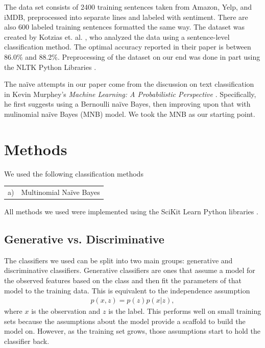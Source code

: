 \documentclass{article} %
\begin{document}
	The data set consists of 2400 training sentences taken from Amazon, Yelp, and iMDB, preprocessed into separate lines and labeled with sentiment. There are also 600 labeled training sentences formatted the same way. The dataset was created by Kotzias et. al. \cite{Kotzias2015}, who analyzed the data using a sentence-level classification method. The optimal accuracy reported in their paper is between 86.0\% and 88.2\%. Preprocessing of the dataset on our end was done in part using the NLTK Python Libraries \cite{nltk}.
	
	The na\"ive attempts in our paper come from the discussion on text classification in Kevin Murphey's \emph{Machine Learning: A Probabilistic Perspective} \cite{Murphy2012}. Specifically, he first suggests using a Bernoulli na\"ive Bayes, then improving upon that with mulinomial na\"ive Bayes (MNB) model. We took the MNB as our starting point. 
	
	
	\section{Methods}
	
	We used the following classification methods
	
	\begin{tabular}{rl}
		a) & Multinomial Na\"ive Bayes\\
	\end{tabular}
	
	All methods we used were implemented using the SciKit Learn Python libraries \cite{scikit-learn}. 
	
	\subsection{Generative vs. Discriminative}
	
	The classifiers we used can be split into two main groups: generative and discriminative classifiers. Generative classifiers are ones that assume a model for the observed features based on the class and then fit the parameters of that model to the training data. This is equivalent to the independence assumption
	\begin{align}
	p(x,z) = p(z)p(x|z),
	\end{align}
	where $x$ is the observation and $z$ is the label. This performs well on small training sets because the assumptions about the model provide a scaffold to build the model on. However, as the training set grows, those assumptions start to hold the classifier back.
	
\end{document}
